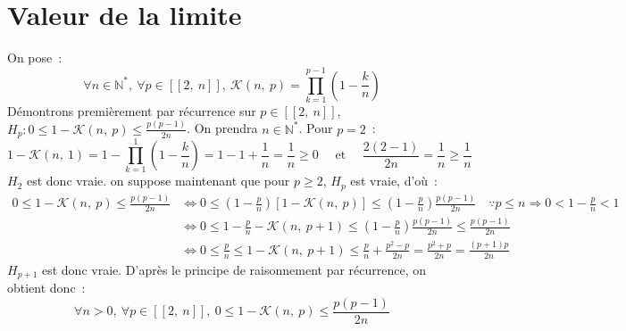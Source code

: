 \documentclass{article}
\begin{document}
  \section*{Valeur de la limite}
  On pose~:
  \begin{displaymath}
    \forall n \in\mathbb{N}^*,\ \forall p \in [\![2,\ n]\!],\ \mathcal{K}(n,\ p) = \prod_{k = 1}^{p - 1} \left(1 - \frac{k}{n}\right)
  \end{displaymath}
  Démontrons premièrement par récurrence sur $p\in[\![2,\ n]\!]$, $H_p: 0 \leqslant 1 - \mathcal{K}(n,\ p) \leqslant \frac{p(p - 1)}{2n}$. On prendra $n \in\mathbb{N}^*$. Pour $p = 2$~:
  \begin{displaymath}
    1 - \mathcal{K}(n,\ 1) = 1 - \prod_{k = 1}^{1} \left(1 - \frac{k}{n}\right) = 1 - 1 + \frac{1}{n} = \frac{1}{n} \geqslant 0 \quad\text{ et }\quad \frac{2(2-1)}{2n} = \frac{1}{n} \geqslant \frac{1}{n}
  \end{displaymath}
  $H_2$ est donc vraie. on suppose maintenant que pour $p \geqslant 2$, $H_p$ est vraie, d'où~:
  \begin{align*}
    0 \leqslant 1 - \mathcal{K}(n,\ p) \leqslant \frac{p(p - 1)}{2n} &\iff 0 \leqslant \left(1 - \frac{p}{n}\right)\left[1 - \mathcal{K}(n,\ p)\right] \leqslant \left(1 - \frac{p}{n}\right)\frac{p(p - 1)}{2n} \quad \because p \leqslant n \Rightarrow 0 < 1 - \frac{p}{n} < 1 \\
    &\iff 0 \leqslant 1 - \frac{p}{n} - \mathcal{K}(n,\ p + 1) \leqslant \left(1 - \frac{p}{n}\right)\frac{p(p - 1)}{2n} \leqslant \frac{p(p - 1)}{2n} \\
    &\iff 0 \leqslant \frac{p}{n} \leqslant 1 - \mathcal{K}(n,\ p + 1) \leqslant \frac{p}{n} + \frac{p^2 - p}{2n} = \frac{p^2 + p}{2n} = \frac{(p+1)p}{2n}
  \end{align*}
  $H_{p+1}$ est donc vraie. D'après le principe de raisonnement par récurrence, on obtient donc~:
  \begin{equation}\label{INEQK}
    \forall n>0,\ \forall p\in[\![2,\ n]\!],\ 0 \leqslant 1 - \mathcal{K}(n,\ p) \leqslant \frac{p(p - 1)}{2n}
  \end{equation}
\end{document}
